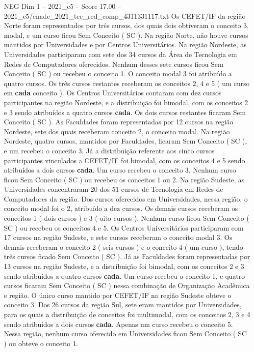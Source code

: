 \begin{textsample}{NEG Dim 1 – 2021\_c5 – Score 17.00 – 2021\_c5/enade\_2021\_tec\_red\_comp\_4311331117.txt}
Os CEFET/IF da região Norte foram representados por três cursos, dos quais dois obtiveram o conceito 3, modal, e um curso ficou Sem Conceito ( SC ).
Na região Norte, não houve cursos mantidos por Universidades e por Centros Universitários.
Na região Nordeste, as Universidades participaram com sete dos 34 cursos da Área de Tecnologia em Redes de Computadores oferecidos.
Nenhum desses sete cursos ficou Sem Conceito ( SC ) ou recebeu o conceito 1.
O conceito modal 3 foi atribuído a quatro cursos.
Os três cursos restantes receberam os conceitos 2, 4 e 5 ( um curso em \textbf{cada} conceito ).
Os Centros Universitários contaram com dez cursos participantes na região Nordeste, e a distribuição foi bimodal, com os conceitos 2 e 3 sendo atribuídos a quatro cursos \textbf{cada}.
Os dois cursos restantes ficaram Sem Conceito ( SC ).
As Faculdades foram representadas por 12 cursos na região Nordeste, sete dos quais receberam conceito 2, o conceito modal.
Na região Nordeste, quatro cursos, mantidos por Faculdades, ficaram Sem Conceito ( SC ), e um recebeu o conceito 3.
Já a distribuição referente aos cinco cursos participantes vinculados a CEFET/IF foi bimodal, com os conceitos 4 e 5 sendo atribuídos a dois cursos \textbf{cada}.
Um curso recebeu o conceito 3.
Nenhum curso ficou Sem Conceito ( SC ) ou recebeu os conceitos 1 ou 2.
Na região Sudeste, as Universidades concentraram 20 dos 51 cursos de Tecnologia em Redes de Computadores da região.
Dos cursos oferecidos em Universidades, nessa região, o conceito modal foi o 2, atribuído a dez cursos.
Os demais cursos receberam os conceitos 1 ( dois cursos ) e 3 ( oito cursos ).
Nenhum curso ficou Sem Conceito ( SC ) ou recebeu os conceitos 4 e 5.
Os Centros Universitários participaram com 17 cursos na região Sudeste, e sete cursos receberam o conceito modal 3.
Os demais receberam o conceito 2 ( seis cursos ) e o conceito 4 ( um curso ), tendo três cursos ficado Sem Conceito ( SC ).
Já as Faculdades foram representadas por 13 cursos na região Sudeste, e a distribuição foi bimodal, com os conceitos 2 e 3 sendo atribuídos a quatro cursos \textbf{cada}.
Um curso recebeu o conceito 1, e quatro cursos ficaram Sem Conceito ( SC ) nessa combinação de Organização Acadêmica e região.
O único curso mantido por CEFET/IF na região Sudeste obteve o conceito 3.
Dos 26 cursos da região Sul, sete eram mantidos por Universidades, para os quais a distribuição de conceitos foi multimodal, com os conceitos 2, 3 e 4 sendo atribuídos a dois cursos \textbf{cada}.
Apenas um curso recebeu o conceito 5.
Nessa região, nenhum curso oferecido em Universidades ficou Sem Conceito ( SC ) ou obteve o conceito 1.

\end{textsample}
